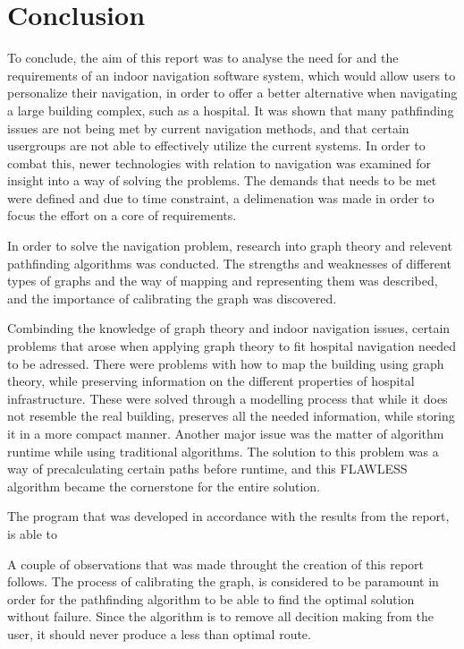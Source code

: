 \chapter{Conclusion}

To conclude, the aim of this report was to analyse the need for and the requirements of an indoor navigation software system, which would allow users to personalize their navigation, in order to offer a better alternative when navigating a large building complex, such as a hospital. It was shown that many pathfinding issues are not being met by current navigation methods, and that certain usergroups are not able to effectively utilize the current systems. In order to combat this, newer technologies with relation to navigation was examined for insight into a way of solving the problems. The demands that needs to be met were defined and due to time constraint, a delimenation was made in order to focus the effort on a core of requirements.

In order to solve the navigation problem, research into graph theory and relevent pathfinding algorithms was conducted. The strengths and weaknesses of different types of graphs and the way of mapping and representing them was described, and the importance of calibrating the graph was discovered. 

Combinding the knowledge of graph theory and indoor navigation issues, certain problems that arose when applying graph theory to fit hospital navigation needed to be adressed. There were problems with how to map the building using graph theory, while preserving information on the different properties of hospital infrastructure. These were solved through a modelling process that while it does not resemble the real building, preserves all the needed information, while storing it in a more compact manner. Another major issue was the matter of algorithm runtime while using traditional algorithms. The solution to this problem was a way of precalculating certain paths before runtime, and this FLAWLESS algorithm became the cornerstone for the entire solution.

The program that was developed in accordance with the results from the report, is able to 

A couple of observations that was made throught the creation of this report follows. The process of calibrating the graph, is considered to be paramount in order for the pathfinding algorithm to be able to find the optimal solution without failure. Since the algorithm is to remove all decition making from the user, it should never produce a less than optimal route.